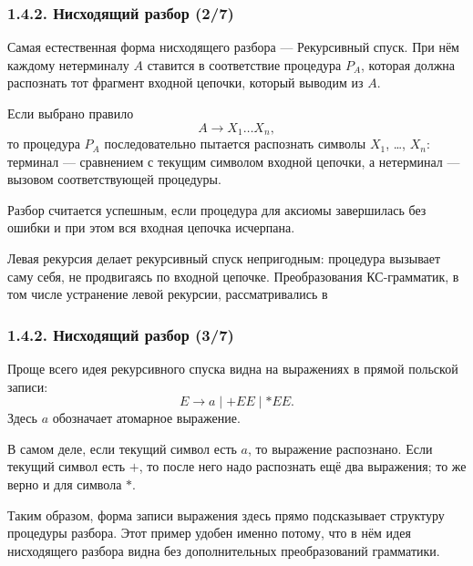 \begin{frame}
\frametitle{1.4.2. Нисходящий разбор (2/7)}

Самая естественная форма нисходящего разбора --- 
{Рекурсивный спуск}. При нём каждому нетерминалу $A$ ставится в соответствие
процедура $P_A$, которая должна распознать тот фрагмент входной цепочки, который
выводим из $A$.

Если выбрано правило
\[
A \to X_1 \dots X_n,
\]
то процедура $P_A$ последовательно пытается распознать символы $X_1$, \dots, $X_n$:
терминал --- сравнением с текущим символом входной цепочки, а нетерминал ---
вызовом соответствующей процедуры.

Разбор считается успешным, если процедура для аксиомы завершилась без ошибки и при
этом вся входная цепочка исчерпана.

\begin{remark}
Левая рекурсия делает рекурсивный спуск непригодным: процедура вызывает саму себя,
не продвигаясь по входной цепочке. Преобразования КС-грамматик, в том числе
устранение левой рекурсии, рассматривались в 
\end{remark}

\end{frame}

\begin{frame}
\frametitle{1.4.2. Нисходящий разбор (3/7)}

\begin{example}
Проще всего идея рекурсивного спуска видна на выражениях в прямой польской записи:
\[
E \to a \mid +EE \mid *EE.
\]
Здесь $a$ обозначает атомарное выражение.

В самом деле, если текущий символ есть $a$, то выражение распознано. Если текущий
символ есть $+$, то после него надо распознать ещё два выражения; то же верно и для
символа $*$.

Таким образом, форма записи выражения здесь прямо подсказывает структуру процедуры
разбора. Этот пример удобен именно потому, что в нём идея нисходящего разбора
видна без дополнительных преобразований грамматики.
\end{example}

\end{frame}

